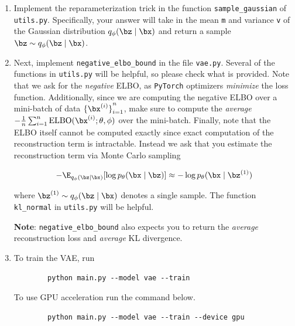 \begin{enumerate}[label=(\alph*)]
    \item {} Implement the reparameterization trick in the function \texttt{sample\_gaussian} of \texttt{utils.py}. 
    Specifically, your answer will take in the mean \texttt{m} and variance \texttt{v} of the Gaussian distribution 
    $q_{\phi}(\bz \mid \bx)$ and return a sample $\bz \sim q_{\phi}(\bz \mid \bx)$.

    \item {} Next, implement \texttt{negative\_elbo\_bound} in the file \texttt{vae.py}. Several of the functions in \texttt{utils.py} 
    will be helpful, so please check what is provided. Note that we ask for the \textit{negative} ELBO, as \texttt{PyTorch} optimizers 
    \textit{minimize} the loss function. Additionally, since we are computing the negative ELBO over a mini-batch of data 
    ${\{\bx^{(i)}\}}_{i=1}^{n}$, make sure to compute the \textit{average} $- \frac{1}{n}\sum_{i=1}^{n} \text{ELBO}(\bx^{(i)}; \theta, \phi)$ 
    over the mini-batch. Finally, note that the ELBO itself cannot be computed exactly since exact computation of the reconstruction 
    term is intractable. Instead we ask that you estimate the reconstruction term via Monte Carlo sampling

    \begin{equation} \label{eq:5}
        - \E_{q_{\phi}(\bz \mid \bx)} [\log p_{\theta}(\bx \mid \bz)] \approx - \log p_{\theta}(\bx \mid \bz^{(1)})
    \end{equation}

    where $\bz^{(1)} \sim q_{\phi}(\bz \mid \bx)$ denotes a single sample. The function \texttt{kl\_normal} in \texttt{utils.py} 
    will be helpful.
    
    \textbf{Note}: \texttt{negative\_elbo\_bound} also expects you to return the \textit{average} reconstruction loss 
    and \textit{average} KL divergence.

    \item {} To train the VAE, run
    
    \begin{verbatim}
        python main.py --model vae --train
    \end{verbatim}

    To use GPU acceleration run the command below.
    \begin{verbatim}
        python main.py --model vae --train --device gpu
    \end{verbatim}
    

\end{enumerate}

